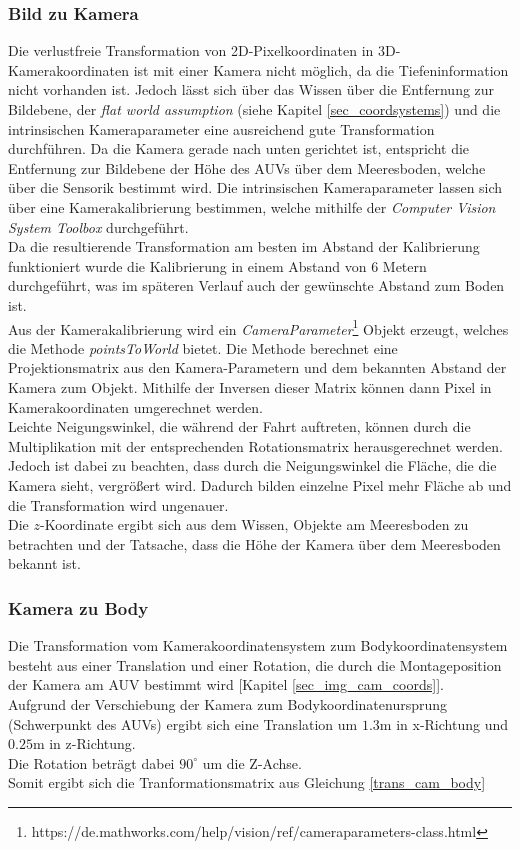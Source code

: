 \subsubsection{Bild zu Kamera}
\label{section_PicToCam}
Die verlustfreie Transformation von 2D-Pixelkoordinaten in 3D-Kamerakoordinaten ist mit einer Kamera nicht möglich, da die Tiefeninformation nicht vorhanden ist. Jedoch lässt sich über das Wissen über die Entfernung zur Bildebene, der \textit{flat world assumption} (siehe Kapitel \ref{sec_coordsystems}) und die intrinsischen Kameraparameter eine ausreichend gute Transformation durchführen. Da die Kamera gerade nach unten gerichtet ist, entspricht die Entfernung zur Bildebene der Höhe des AUVs über dem Meeresboden, welche über die Sensorik bestimmt wird. Die intrinsischen Kameraparameter lassen sich über eine Kamerakalibrierung bestimmen, welche mithilfe der \matlab \textit{Computer Vision System Toolbox} durchgeführt.\\
Da die resultierende Transformation am besten im Abstand der Kalibrierung funktioniert wurde die Kalibrierung in einem Abstand von 6 Metern durchgeführt, was im späteren Verlauf auch der gewünschte Abstand zum Boden ist.\\
Aus der Kamerakalibrierung wird ein \textit{CameraParameter}\footnote{https://de.mathworks.com/help/vision/ref/cameraparameters-class.html} Objekt erzeugt, welches die Methode \textit{pointsToWorld} bietet. Die Methode berechnet eine Projektionsmatrix aus den Kamera-Parametern und dem bekannten Abstand der Kamera zum Objekt. Mithilfe der Inversen dieser Matrix können dann Pixel in Kamerakoordinaten umgerechnet werden.\\
Leichte Neigungswinkel, die während der Fahrt auftreten, können durch die Multiplikation mit der entsprechenden Rotationsmatrix herausgerechnet werden. Jedoch ist dabei zu beachten, dass durch die Neigungswinkel die Fläche, die die Kamera sieht, vergrößert wird. Dadurch bilden einzelne Pixel mehr Fläche ab und die Transformation wird ungenauer.\\
Die $z$-Koordinate ergibt sich aus dem Wissen, Objekte am Meeresboden zu betrachten und der Tatsache, dass die Höhe der Kamera über dem Meeresboden bekannt ist.

\subsubsection{Kamera zu Body}
Die Transformation vom Kamerakoordinatensystem zum Bodykoordinatensystem besteht aus einer Translation und einer Rotation, die durch die Montageposition der Kamera am AUV bestimmt wird [Kapitel \ref{sec_img_cam_coords}].\\
Aufgrund der Verschiebung der Kamera zum Bodykoordinatenursprung (Schwerpunkt des AUVs) ergibt sich eine Translation um $1.3$m in x-Richtung und $0.25$m in z-Richtung.\\
Die Rotation beträgt dabei $90^\circ$ um die Z-Achse.\\
Somit ergibt sich die Tranformationsmatrix aus Gleichung \ref{trans_cam_body}\\

